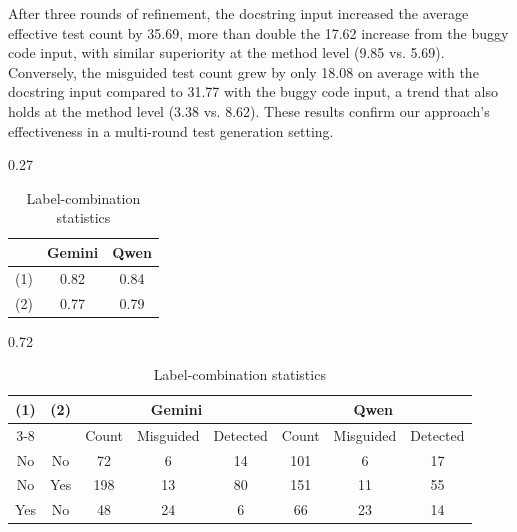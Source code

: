 \documentclass[acmsmall]{acmart}
\begin{document}
After three rounds of refinement, the docstring input increased the average effective test count by 35.69, more than double the 17.62 increase from the buggy code input, with similar superiority at the method level (9.85 vs. 5.69). Conversely, the misguided test count grew by only 18.08 on average with the docstring input compared to 31.77 with the buggy code input, a trend that also holds at the method level (3.38 vs. 8.62). These results confirm our approach's effectiveness in a multi-round test generation setting.


\begin{table}[ht]
\vspace{-0.6em}
\centering
\caption{Cohen's $\kappa$ agreement and label-combination statistics for Gemini and Qwen.}
\vspace{-1.0em}
\label{tab:kappa_and_term_stats}

\begin{subtable}[c]{0.27\textwidth}
\centering
\scriptsize
\caption{Cohen's $\kappa$}
\vspace{-0.4em}
\label{tab:cohens_kappa_sub}
\begin{tabular}{lcc}
\hline
 & Gemini & Qwen \\
\hline
(1) & 0.82 & 0.84 \\
(2) & 0.77 & 0.79 \\
\hline
\end{tabular}
\end{subtable}
\hfill
\begin{subtable}[c]{0.72\textwidth}
\centering
\tiny
\caption{Label-combination statistics}
\vspace{-0.4em}
\label{tab:term_combination_stats_sub}
\begin{tabular}{cc|ccc|ccc}
\hline
\multirow{2}{*}{(1)}
& \multirow{2}{*}{(2)}
& \multicolumn{3}{c|}{Gemini}
& \multicolumn{3}{c}{Qwen} \\
\cline{3-8}
& & Count & Misguided & Detected & Count & Misguided & Detected \\
\hline
No  & No  & 72  & 6  & 14 & 101 & 6  & 17 \\
No  & Yes & 198 & 13 & 80 & 151 & 11 & 55 \\
Yes & No  & 48  & 24 & 6  & 66  & 23 & 14 \\
\hline
\end{tabular}
\end{subtable}
\vspace{-1.2em}
\end{table}
\end{document}
